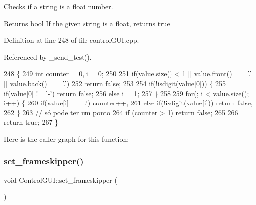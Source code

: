 Checks if a string is a float number. 

\begin{DoxyReturn}{Returns}
bool If the given string is a float, returns true 
\end{DoxyReturn}


Definition at line 248 of file control\+G\+U\+I.\+cpp.



Referenced by \+\_\+send\+\_\+test().


\begin{DoxyCode}
248                                         \{
249     \textcolor{keywordtype}{int} counter = 0, i = 0;
250 
251     \textcolor{keywordflow}{if}(value.size() < 1 || value.front() == \textcolor{charliteral}{'.'} || value.back() == \textcolor{charliteral}{'.'})
252         \textcolor{keywordflow}{return} \textcolor{keyword}{false};
253 
254     \textcolor{keywordflow}{if}(!isdigit(value[0])) \{
255         \textcolor{keywordflow}{if}(value[0] != \textcolor{charliteral}{'-'}) \textcolor{keywordflow}{return} \textcolor{keyword}{false};
256         \textcolor{keywordflow}{else} i = 1;
257     \}
258 
259     \textcolor{keywordflow}{for}(; i < value.size(); i++) \{
260         \textcolor{keywordflow}{if}(value[i] == \textcolor{charliteral}{'.'}) counter++;
261         \textcolor{keywordflow}{else} \textcolor{keywordflow}{if}(!isdigit(value[i])) \textcolor{keywordflow}{return} \textcolor{keyword}{false};
262     \}
263     \textcolor{comment}{// só pode ter um ponto}
264     \textcolor{keywordflow}{if} (counter > 1) \textcolor{keywordflow}{return} \textcolor{keyword}{false};
265 
266     \textcolor{keywordflow}{return} \textcolor{keyword}{true};
267 \}
\end{DoxyCode}
Here is the caller graph for this function\+:
\mbox{\label{class_control_g_u_i_ab3017ac43a33b7dd0a79db25e354fcf2}} 
\subsubsection{\texorpdfstring{set\+\_\+frameskipper()}{set\_frameskipper()}}
{\footnotesize\ttfamily void Control\+G\+U\+I\+::set\+\_\+frameskipper (\begin{DoxyParamCaption}{ }\end{DoxyParamCaption})}



